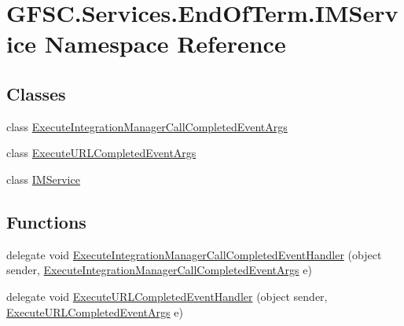 \hypertarget{namespace_g_f_s_c_1_1_services_1_1_end_of_term_1_1_i_m_service}{}\section{G\+F\+S\+C.\+Services.\+End\+Of\+Term.\+I\+M\+Service Namespace Reference}
\label{namespace_g_f_s_c_1_1_services_1_1_end_of_term_1_1_i_m_service}
\subsection*{Classes}
\begin{DoxyCompactItemize}
\item 
class \mbox{\hyperlink{class_g_f_s_c_1_1_services_1_1_end_of_term_1_1_i_m_service_1_1_execute_integration_manager_call_completed_event_args}{Execute\+Integration\+Manager\+Call\+Completed\+Event\+Args}}
\item 
class \mbox{\hyperlink{class_g_f_s_c_1_1_services_1_1_end_of_term_1_1_i_m_service_1_1_execute_u_r_l_completed_event_args}{Execute\+U\+R\+L\+Completed\+Event\+Args}}
\item 
class \mbox{\hyperlink{class_g_f_s_c_1_1_services_1_1_end_of_term_1_1_i_m_service_1_1_i_m_service}{I\+M\+Service}}
\end{DoxyCompactItemize}
\subsection*{Functions}
\begin{DoxyCompactItemize}
\item 
delegate void \mbox{\hyperlink{namespace_g_f_s_c_1_1_services_1_1_end_of_term_1_1_i_m_service_a858838abf61235c305544d4b92176bf8}{Execute\+Integration\+Manager\+Call\+Completed\+Event\+Handler}} (object sender, \mbox{\hyperlink{class_g_f_s_c_1_1_services_1_1_end_of_term_1_1_i_m_service_1_1_execute_integration_manager_call_completed_event_args}{Execute\+Integration\+Manager\+Call\+Completed\+Event\+Args}} e)
\item 
delegate void \mbox{\hyperlink{namespace_g_f_s_c_1_1_services_1_1_end_of_term_1_1_i_m_service_af61025d4aca051465e8b8968b284e3d8}{Execute\+U\+R\+L\+Completed\+Event\+Handler}} (object sender, \mbox{\hyperlink{class_g_f_s_c_1_1_services_1_1_end_of_term_1_1_i_m_service_1_1_execute_u_r_l_completed_event_args}{Execute\+U\+R\+L\+Completed\+Event\+Args}} e)
\end{DoxyCompactItemize}


